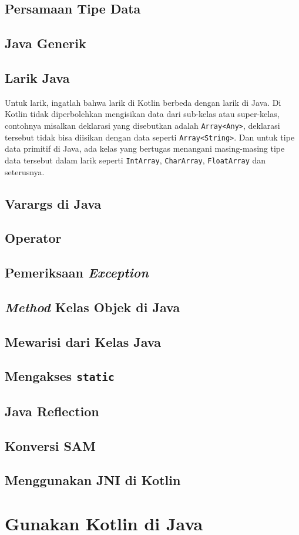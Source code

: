 \subsection{Persamaan Tipe Data}

\subsection{Java Generik}

\subsection{Larik Java}

Untuk larik, ingatlah bahwa larik di Kotlin berbeda dengan larik di Java. Di Kotlin tidak diperbolehkan mengisikan data dari sub-kelas atau super-kelas, contohnya misalkan deklarasi yang disebutkan adalah \texttt{Array<Any>}, deklarasi tersebut tidak bisa diisikan dengan data seperti \texttt{Array<String>}. Dan untuk tipe data primitif di Java, ada kelas yang bertugas menangani masing-masing tipe data tersebut dalam larik seperti \texttt{IntArray}, \texttt{CharArray}, \texttt{FloatArray} dan seterusnya.

\subsection{Varargs di Java}

\subsection{Operator}

\subsection{Pemeriksaan \textit{Exception}}

\subsection{\textit{Method} Kelas Objek di Java}

\subsection{Mewarisi dari Kelas Java}

\subsection{Mengakses \texttt{static}}

\subsection{Java Reflection}

\subsection{Konversi SAM}

\subsection{Menggunakan JNI di Kotlin}

\section{Gunakan Kotlin di Java}